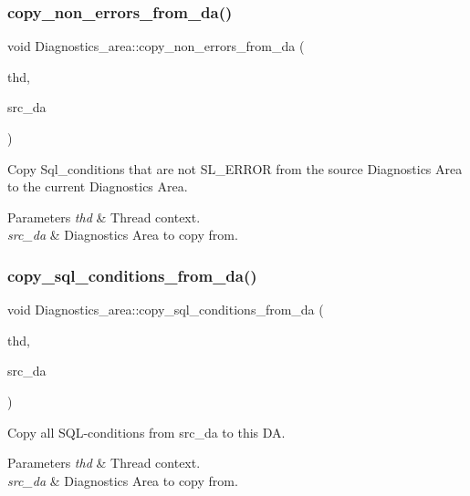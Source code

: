 \subsubsection{\texorpdfstring{copy\+\_\+non\+\_\+errors\+\_\+from\+\_\+da()}{copy\_non\_errors\_from\_da()}}
{\footnotesize\ttfamily void Diagnostics\+\_\+area\+::copy\+\_\+non\+\_\+errors\+\_\+from\+\_\+da (\begin{DoxyParamCaption}\item[{T\+HD $\ast$}]{thd,  }\item[{const \mbox{\hyperlink{classDiagnostics__area}{Diagnostics\+\_\+area}} $\ast$}]{src\+\_\+da }\end{DoxyParamCaption})}

Copy Sql\+\_\+conditions that are not S\+L\+\_\+\+E\+R\+R\+OR from the source Diagnostics Area to the current Diagnostics Area.


\begin{DoxyParams}{Parameters}
{\em thd} & Thread context. \\
\hline
{\em src\+\_\+da} & Diagnostics Area to copy from. \\
\hline
\end{DoxyParams}
\mbox{\label{classDiagnostics__area_abe64d1bc735a09bc3e29bec271b9face}} 
\subsubsection{\texorpdfstring{copy\+\_\+sql\+\_\+conditions\+\_\+from\+\_\+da()}{copy\_sql\_conditions\_from\_da()}}
{\footnotesize\ttfamily void Diagnostics\+\_\+area\+::copy\+\_\+sql\+\_\+conditions\+\_\+from\+\_\+da (\begin{DoxyParamCaption}\item[{T\+HD $\ast$}]{thd,  }\item[{const \mbox{\hyperlink{classDiagnostics__area}{Diagnostics\+\_\+area}} $\ast$}]{src\+\_\+da }\end{DoxyParamCaption})}

Copy all S\+QL-\/conditions from src\+\_\+da to this DA.


\begin{DoxyParams}{Parameters}
{\em thd} & Thread context. \\
\hline
{\em src\+\_\+da} & Diagnostics Area to copy from. \\
\hline
\end{DoxyParams}
\mbox{\label{classDiagnostics__area_a21f866b70d386e88bc576ed62ba7aaf0}} 
